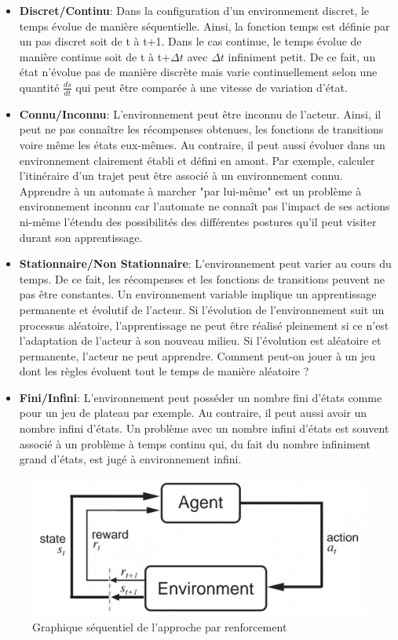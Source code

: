 \begin{itemize}
    \item \textbf{Discret/Continu}: Dans la configuration d'un environnement discret, le temps évolue de manière séquentielle. Ainsi, la fonction temps est définie par un pas discret soit de t à t+1. Dans le cas continue, le temps évolue de manière continue soit de t à t+$\Delta t$ avec $\Delta t$ infiniment petit. De ce fait, un état n'évolue pas de manière discrète mais varie continuellement selon une quantité $\frac{ds}{dt}$ qui peut être comparée à une vitesse de variation d'état.

    \item \textbf{Connu/Inconnu}: L'environnement peut être inconnu de l'acteur. Ainsi, il peut ne pas connaître les récompenses obtenues, les fonctions de transitions voire même les états eux-mêmes. Au contraire, il peut aussi évoluer dans un environnement clairement établi et défini en amont. Par exemple, calculer l'itinéraire d'un trajet peut être associé à un environnement connu. Apprendre à un automate à marcher "par lui-même" est un problème à environnement inconnu car l'automate ne connaît pas l'impact de ses actions ni-même l'étendu des possibilités des différentes postures qu'il peut visiter durant son apprentissage.

    \item \textbf{Stationnaire/Non Stationnaire}: L'environnement peut varier au cours du temps. De ce fait, les récompenses et les fonctions de transitions peuvent ne pas être constantes. Un environnement variable implique un apprentissage permanente et évolutif de l'acteur. Si l'évolution de l'environnement suit un processus aléatoire, l'apprentissage ne peut être réalisé pleinement si ce n'est l'adaptation de l'acteur à son nouveau milieu. Si l'évolution est aléatoire et permanente, l'acteur ne peut apprendre. Comment peut-on jouer à un jeu dont les règles évoluent tout le temps de manière aléatoire ?

    \item \textbf{Fini/Infini}: L'environnement peut posséder un nombre fini d'états comme pour un jeu de plateau par exemple. Au contraire, il peut aussi avoir un nombre infini d'états. Un problème avec un nombre infini d'états est souvent associé à un problème à temps continu qui, du fait du nombre infiniment grand d'états, est jugé à environnement infini.
\end{itemize}

\begin{figure}
\centering
\includegraphics[scale=0.3]{./tex/reinforcement-learning/genrenf.png}
\caption{Graphique séquentiel de l'approche par renforcement}
\label{genrefpic}
\end{figure}

